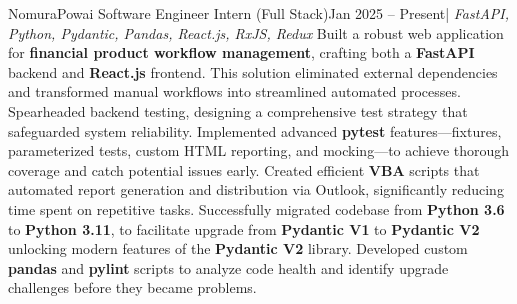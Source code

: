 \resumeSubheading
{Nomura}{Powai}
{Software Engineer Intern (Full Stack)}{Jan 2025 -- Present}{| \textit{FastAPI, Python, Pydantic, Pandas, React.js, RxJS, Redux}}
\resumeItemListStart
{} 
{Built a robust web application for \textbf{financial product workflow management}, crafting both a \textbf{FastAPI} backend and \textbf{React.js} frontend. This solution eliminated external dependencies and transformed manual workflows into streamlined automated processes.}
{Spearheaded backend testing, designing a comprehensive test strategy that safeguarded system reliability. Implemented advanced \textbf{pytest} features—fixtures, parameterized tests, custom HTML reporting, and mocking—to achieve thorough coverage and catch potential issues early.}
{Created efficient \textbf{VBA} scripts that automated report generation and distribution via Outlook, significantly reducing time spent on repetitive tasks.}
{Successfully migrated codebase from \textbf{Python 3.6} to \textbf{Python 3.11}, to facilitate upgrade from \textbf{Pydantic V1} to \textbf{Pydantic V2} unlocking modern features of the \textbf{Pydantic V2} library. Developed custom \textbf{pandas} and \textbf{pylint} scripts to analyze code health and identify upgrade challenges before they became problems.}
\resumeItemListEnd